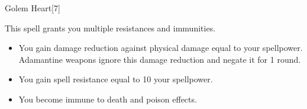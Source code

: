 \begin{spellsection}{Golem Heart}[7]
    \begin{spellheader}
    \end{spellheader}
    \begin{spellcontent}
        \begin{spelltargetinginfo}
        \end{spelltargetinginfo}
        \begin{spelleffects}
            \spelleffect This spell grants you multiple resistances and immunities.
            \begin{itemize}
                \item You gain damage reduction against physical damage equal to your spellpower. Adamantine weapons ignore this damage reduction and negate it for 1 round.
                \item You gain spell resistance equal to 10 \add your spellpower.
                \item You become immune to death and poison effects.
            \end{itemize}
            \spelldur \durshort
        \end{spelleffects}
    \end{spellcontent}
    \begin{spellfooter}
        \miscastexplode
    \end{spellfooter}
\end{spellsection}

